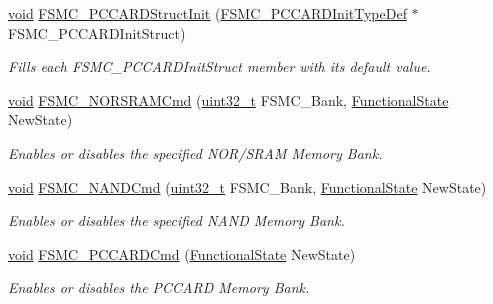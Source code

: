 \begin{DoxyCompactItemize}
\hyperlink{usb__devapi_8h_afabf60e7f57651d6d595a02c75f07cd0}{void} \hyperlink{group___f_s_m_c___private___functions_ga7a64ba0e0545b3f1913c9d1d28c05e62}{F\+S\+M\+C\+\_\+\+P\+C\+C\+A\+R\+D\+Struct\+Init} (\hyperlink{struct_f_s_m_c___p_c_c_a_r_d_init_type_def}{F\+S\+M\+C\+\_\+\+P\+C\+C\+A\+R\+D\+Init\+Type\+Def} $\ast$F\+S\+M\+C\+\_\+\+P\+C\+C\+A\+R\+D\+Init\+Struct)
\begin{DoxyCompactList}\small\item\em Fills each F\+S\+M\+C\+\_\+\+P\+C\+C\+A\+R\+D\+Init\+Struct member with its default value. \end{DoxyCompactList}\item 
\hyperlink{usb__devapi_8h_afabf60e7f57651d6d595a02c75f07cd0}{void} \hyperlink{group___f_s_m_c___private___functions_gaf943f0f2680168d3a95a3c2c9f3eca2a}{F\+S\+M\+C\+\_\+\+N\+O\+R\+S\+R\+A\+M\+Cmd} (\hyperlink{_p_e___types_8h_a33594304e786b158f3fb30289278f5af}{uint32\+\_\+t} F\+S\+M\+C\+\_\+\+Bank, \hyperlink{agilefox_2library_2inc_2stm32f10x__type_8h_ac9a7e9a35d2513ec15c3b537aaa4fba1}{Functional\+State} New\+State)
\begin{DoxyCompactList}\small\item\em Enables or disables the specified N\+O\+R/\+S\+R\+AM Memory Bank. \end{DoxyCompactList}\item 
\hyperlink{usb__devapi_8h_afabf60e7f57651d6d595a02c75f07cd0}{void} \hyperlink{group___f_s_m_c___private___functions_ga33ec7c39ea4d42e92c72c6e517d8235c}{F\+S\+M\+C\+\_\+\+N\+A\+N\+D\+Cmd} (\hyperlink{_p_e___types_8h_a33594304e786b158f3fb30289278f5af}{uint32\+\_\+t} F\+S\+M\+C\+\_\+\+Bank, \hyperlink{agilefox_2library_2inc_2stm32f10x__type_8h_ac9a7e9a35d2513ec15c3b537aaa4fba1}{Functional\+State} New\+State)
\begin{DoxyCompactList}\small\item\em Enables or disables the specified N\+A\+ND Memory Bank. \end{DoxyCompactList}\item 
\hyperlink{usb__devapi_8h_afabf60e7f57651d6d595a02c75f07cd0}{void} \hyperlink{group___f_s_m_c___private___functions_ga2d410151ceb3428c6a1bf374a0472cde}{F\+S\+M\+C\+\_\+\+P\+C\+C\+A\+R\+D\+Cmd} (\hyperlink{agilefox_2library_2inc_2stm32f10x__type_8h_ac9a7e9a35d2513ec15c3b537aaa4fba1}{Functional\+State} New\+State)
\begin{DoxyCompactList}\small\item\em Enables or disables the P\+C\+C\+A\+RD Memory Bank. \end{DoxyCompactList}\item 

\end{DoxyCompactItemize}
